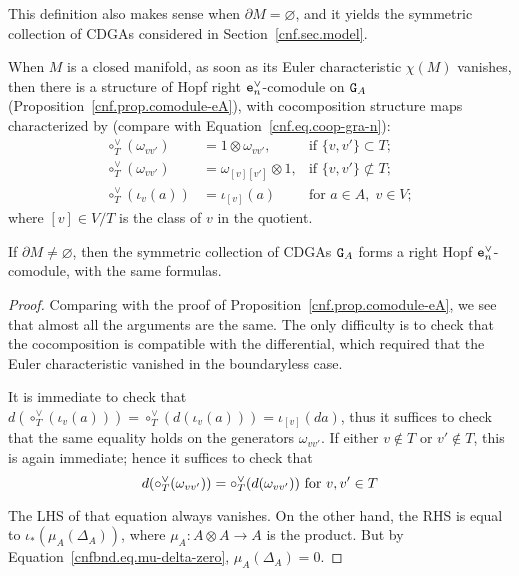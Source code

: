 This definition also makes sense when $\partial M = \varnothing$, and it yields the symmetric collection of CDGAs considered in Section~\ref{cnf.sec.model}.

When $M$ is a closed manifold, as soon as its Euler characteristic $\chi(M)$ vanishes, then there is a structure of Hopf right $\mathtt{e}_{n}^{\vee}$-comodule on $\mathtt{G}_{A}$ (Proposition~\ref{cnf.prop.comodule-eA}), with cocomposition structure maps characterized by (compare with Equation~\eqref{cnf.eq.coop-gra-n}):
\begin{equation}
  \begin{aligned}
    \circ^{\vee}_{T}(\omega_{vv'})
    & = 1 \otimes \omega_{vv'},
    & \text{if } \{v, v'\} \subset T; \\
    \circ^{\vee}_{T}(\omega_{vv'})
    & = \omega_{[v][v']} \otimes 1,
    & \text{if } \{v,v'\} \not \subset T; \\
    \circ_{T}^{\vee}(\iota_{v}(a))
    & = \iota_{[v]}(a)
    & \text{for } a \in A, \; v \in V;
  \end{aligned}
\end{equation}
where $[v] \in V/T$ is the class of $v$ in the quotient.

\begin{proposition}
  \label{cnfbnd.prop.ga-comod}
  If $\partial M \neq \varnothing$, then the symmetric collection of CDGAs $\mathtt{G}_{A}$ forms a right Hopf $\mathtt{e}_{n}^{\vee}$-comodule, with the same formulas.
\end{proposition}
\begin{proof}
  Comparing with the proof of Proposition~\ref{cnf.prop.comodule-eA}, we see that almost all the arguments are the same.
  The only difficulty is to check that the cocomposition is compatible with the differential, which required that the Euler characteristic vanished in the boundaryless case.

  It is immediate to check that $d(\circ_{T}^{\vee}(\iota_{v}(a))) = \circ_{T}^{\vee}(d(\iota_{v}(a))) = \iota_{[v]}(da)$, thus it suffices to check that the same equality holds on the generators $\omega_{vv'}$.
  If either $v \not\in T$ or $v' \not\in T$, this is again immediate; hence it suffices to check that
  \[ d(\circ_{T}^{\vee}(\omega_{vv'})) = \circ_{T}^{\vee}(d(\omega_{vv'})) \textnormal{ for } v,v' \in T \]

  The LHS of that equation always vanishes.
  On the other hand, the RHS is equal to $\iota_{*}(\mu_{A}(\Delta_{A}))$, where $\mu_{A} : A \otimes A \to A$ is the product.
  But by Equation~\eqref{cnfbnd.eq.mu-delta-zero}, $\mu_{A}(\Delta_{A}) = 0$.
\end{proof}

